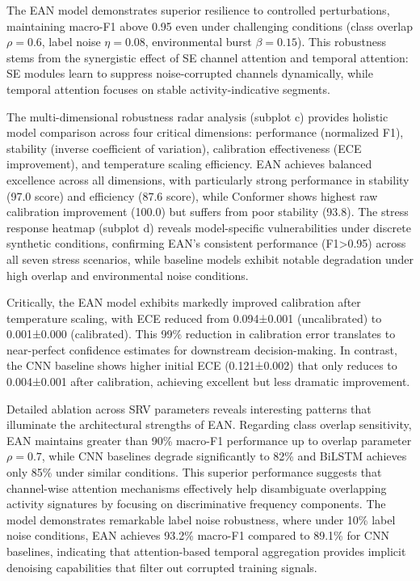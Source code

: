 \documentclass[lettersize,journal]{IEEEtran}
\begin{document}
The EAN model demonstrates superior resilience to controlled perturbations, maintaining macro-F1 above 0.95 even under challenging conditions (class overlap $\rho=0.6$, label noise $\eta=0.08$, environmental burst $\beta=0.15$). This robustness stems from the synergistic effect of SE channel attention and temporal attention: SE modules learn to suppress noise-corrupted channels dynamically, while temporal attention focuses on stable activity-indicative segments.

The multi-dimensional robustness radar analysis (subplot c) provides holistic model comparison across four critical dimensions: performance (normalized F1), stability (inverse coefficient of variation), calibration effectiveness (ECE improvement), and temperature scaling efficiency. EAN achieves balanced excellence across all dimensions, with particularly strong performance in stability (97.0 score) and efficiency (87.6 score), while Conformer shows highest raw calibration improvement (100.0) but suffers from poor stability (93.8). The stress response heatmap (subplot d) reveals model-specific vulnerabilities under discrete synthetic conditions, confirming EAN's consistent performance (F1>0.95) across all seven stress scenarios, while baseline models exhibit notable degradation under high overlap and environmental noise conditions.

Critically, the EAN model exhibits markedly improved calibration after temperature scaling, with ECE reduced from 0.094±0.001 (uncalibrated) to 0.001±0.000 (calibrated). This 99\% reduction in calibration error translates to near-perfect confidence estimates for downstream decision-making. In contrast, the CNN baseline shows higher initial ECE (0.121±0.002) that only reduces to 0.004±0.001 after calibration, achieving excellent but less dramatic improvement.

Detailed ablation across SRV parameters reveals interesting patterns that illuminate the architectural strengths of EAN. Regarding class overlap sensitivity, EAN maintains greater than 90\% macro-F1 performance up to overlap parameter $\rho=0.7$, while CNN baselines degrade significantly to 82\% and BiLSTM achieves only 85\% under similar conditions. This superior performance suggests that channel-wise attention mechanisms effectively help disambiguate overlapping activity signatures by focusing on discriminative frequency components. The model demonstrates remarkable label noise robustness, where under 10\% label noise conditions, EAN achieves 93.2\% macro-F1 compared to 89.1\% for CNN baselines, indicating that attention-based temporal aggregation provides implicit denoising capabilities that filter out corrupted training signals.
\end{document}
